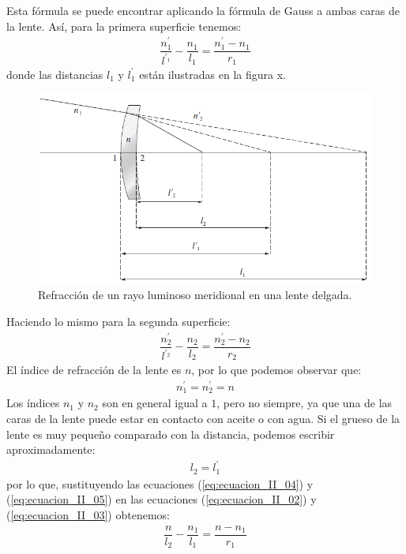 \documentclass[14pt]{extarticle}
\begin{document}
Esta fórmula se puede encontrar aplicando la fórmula de Gauss a ambas caras de la lente. Así, para la primera superficie tenemos:
\begin{align}
\dfrac{n^{\prime}_{1}}{l^{\prime_{1}}} - \dfrac{n_{1}}{l_{1}} = \dfrac{n_{1}^{\prime} - n_{1}}{r_{1}}
\label{eq:ecuacion_II_02} 
\end{align}
donde las distancias $l_{1}$ y $l_{1}^{\prime}$ están ilustradas en la figura x.
\begin{figure}[H]
    \centering
    \includegraphics[scale=0.75]{Imagenes/Lentes_04.png}
    \caption{Refracción de un rayo luminoso meridional en una lente delgada.}
    \label{fig:figura_II_03}
\end{figure}
Haciendo lo mismo para la segunda superficie:
\begin{align}
\dfrac{n^{\prime}_{2}}{l^{\prime_{2}}} - \dfrac{n_{2}}{l_{2}} = \dfrac{n_{2}^{\prime} - n_{2}}{r_{2}}
\label{eq:ecuacion_II_03} 
\end{align}
El índice de refracción de la lente es $n$, por lo que podemos observar que:
\begin{align}
n_{1}^{\prime} = n_{2}^{\prime} = n
\label{eq:ecuacion_II_04}
\end{align}
Los índices $n_{1}$ y $n_{2}$ son en general igual a $1$, pero no siempre, ya que una de las caras de la lente puede estar en contacto con aceite o con agua. Si el grueso de la lente es muy pequeño comparado con la distancia, podemos escribir aproximadamente:
\begin{align}
l_{2} = l_{1}^{\prime}
\label{eq:ecuacion_II_05}
\end{align}
por lo que, sustituyendo las ecuaciones (\ref{eq:ecuacion_II_04}) y (\ref{eq:ecuacion_II_05}) en las ecuaciones (\ref{eq:ecuacion_II_02}) y (\ref{eq:ecuacion_II_03}) obtenemos:
\begin{align}
\dfrac{n}{l_{2}} - \dfrac{n_{1}}{l_{1}} = \dfrac{n - n_{1}}{r_{1}}
\label{eq:ecuacion_II_06}
\end{align}
\end{document}
